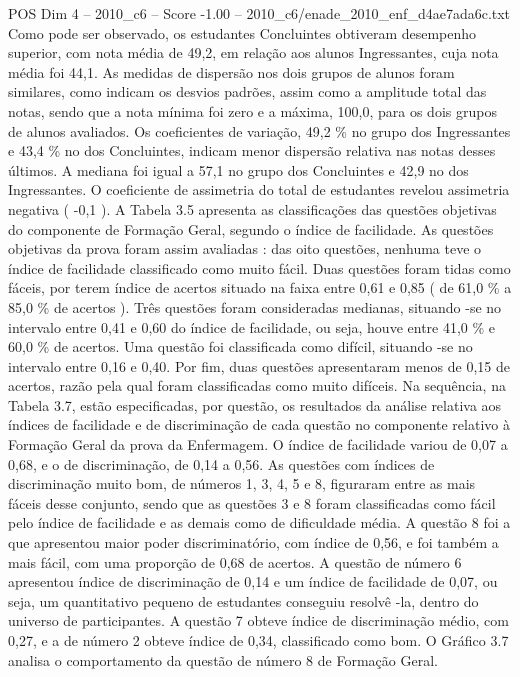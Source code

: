 \begin{textsample}{POS Dim 4 – 2010\_c6 – Score -1.00 – 2010\_c6/enade\_2010\_enf\_d4ae7ada6c.txt}
Como pode ser observado, os estudantes Concluintes obtiveram desempenho superior, com nota média de 49,2, em relação aos alunos Ingressantes, cuja nota média foi 44,1.
As medidas de dispersão nos dois grupos de alunos foram similares, como indicam os desvios padrões, assim como a amplitude total das notas, sendo que a nota mínima foi zero e a máxima, 100,0, para os dois grupos de alunos avaliados.
Os coeficientes de variação, 49,2 \% no grupo dos Ingressantes e 43,4 \% no dos Concluintes, indicam menor dispersão relativa nas notas desses últimos.
A mediana foi igual a 57,1 no grupo dos Concluintes e 42,9 no dos Ingressantes.
O coeficiente de assimetria do total de estudantes revelou assimetria negativa ( -0,1 ).
A Tabela 3.5 apresenta as classificações das questões objetivas do componente de Formação Geral, segundo o índice de facilidade.
As questões objetivas da prova foram assim avaliadas : das oito questões, nenhuma teve o índice de facilidade classificado como muito fácil.
Duas questões foram tidas como fáceis, por terem índice de acertos situado na faixa entre 0,61 e 0,85 ( de 61,0 \% a 85,0 \% de acertos ).
Três questões foram consideradas medianas, situando -se no intervalo entre 0,41 e 0,60 do índice de facilidade, ou seja, houve entre 41,0 \% e 60,0 \% de acertos.
Uma questão foi classificada como difícil, situando -se no intervalo entre 0,16 e 0,40.
Por fim, duas questões apresentaram menos de 0,15 de acertos, razão pela qual foram classificadas como muito difíceis.
Na sequência, na Tabela 3.7, estão especificadas, por questão, os resultados da análise relativa aos índices de facilidade e de discriminação de cada questão no componente relativo à Formação Geral da prova da Enfermagem.
O índice de facilidade variou de 0,07 a 0,68, e o de discriminação, de 0,14 a 0,56.
As questões com índices de discriminação muito bom, de números 1, 3, 4, 5 e 8, figuraram entre as mais fáceis desse conjunto, sendo que as questões 3 e 8 foram classificadas como fácil pelo índice de facilidade e as demais como de dificuldade média.
A questão 8 foi a que apresentou maior poder discriminatório, com índice de 0,56, e foi também a mais fácil, com uma proporção de 0,68 de acertos.
A questão de número 6 apresentou índice de discriminação de 0,14 e um índice de facilidade de 0,07, ou seja, um quantitativo pequeno de estudantes conseguiu resolvê -la, dentro do universo de participantes.
A questão 7 obteve índice de discriminação médio, com 0,27, e a de número 2 obteve índice de 0,34, classificado como bom.
O Gráfico 3.7 analisa o comportamento da questão de número 8 de Formação Geral.

\end{textsample}
